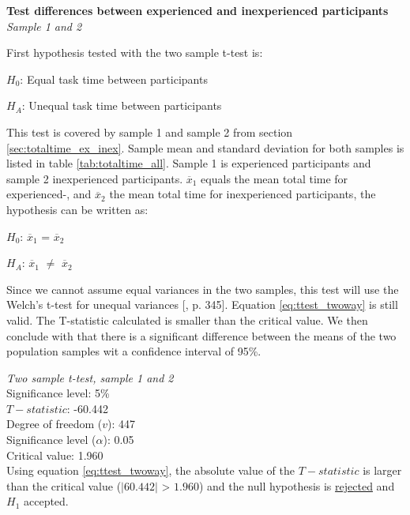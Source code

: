 \textbf{Test differences between experienced and inexperienced participants}\\
\textit{Sample 1 and 2}\newline

First hypothesis tested with the two sample t-test is: \\[0.3cm]

\centerline{$H_{0}$: Equal task time between participants} 
\centerline{$H_{A}$: Unequal task time between participants}

\vspace{0.3cm}

This test is covered by sample 1 and sample 2 from section \ref{sec:totaltime_ex_inex}. Sample mean and standard deviation for both samples is listed in table \ref{tab:totaltime_all}. Sample 1 is experienced participants and sample 2 inexperienced participants. $\overline{x}_1$ equals the mean total time for experienced-, and $\overline{x}_2$ the mean total time for inexperienced participants, the hypothesis can be written as:\\[0.3cm]

\centerline{$H_{0}$: $\overline{x}_1$ = $\overline{x}_2$} 
\centerline{$H_{A}$: $\overline{x}_1$ $\neq$ $\overline{x}_2$}

\vspace{0.3cm}

Since we cannot assume equal variances in the two samples, this test will use the Welch's t-test for unequal variances [\citep{Walpole2012}, p. 345]. Equation \ref{eq:ttest_twoway} is still valid. The T-statistic calculated is smaller than the critical value. We then conclude with that there is a significant difference between the means of the two population samples wit a confidence interval of 95\%.\\[0.2cm]

 \begin{center}
	\begin{tcolorbox}[box align=center,width=\textwidth-5cm]
		\centering
		\textit{Two sample t-test, sample 1 and 2}\\
		Significance level: 5\%  \\[0.5cm]
		
		$T-statistic$: -60.442 \\
		Degree of freedom ($v$): 447 \\ %
		Significance level ($\alpha$): 0.05 \\
		Critical value: 1.960\\[0.2cm]
		
		Using equation \ref{eq:ttest_twoway}, the absolute value of the $T-statistic$ is larger than the critical value ($|60.442|$ > $1.960$) and the null hypothesis is \underline{rejected} and $H_1$ accepted.\\[0.5cm]

	\end{tcolorbox} 
\end{center}

